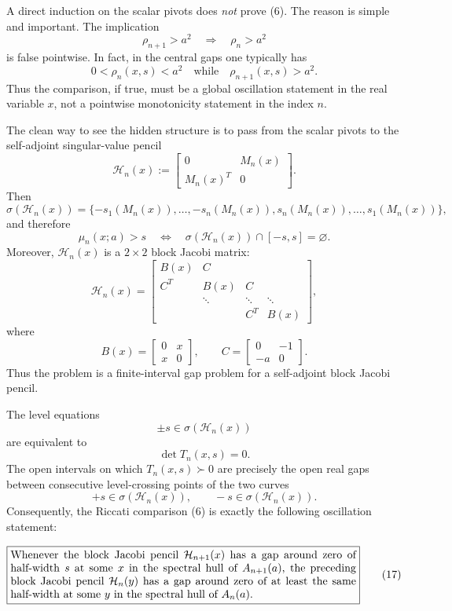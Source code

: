 \documentclass[11pt]{article}
\begin{document}
A direct induction on the scalar pivots does \emph{not} prove (6).  The reason is simple and important.  The implication
\[
\rho_{n+1}>a^2
\quad\Longrightarrow\quad
\rho_n>a^2
\tag{7}
\]
is false pointwise.  In fact, in the central gaps one typically has
\[
0<\rho_n(x,s)<a^2
\quad\text{while}\quad
\rho_{n+1}(x,s)>a^2.
\tag{8}
\]
Thus the comparison, if true, must be a global oscillation statement in the real variable \(x\), not a pointwise monotonicity statement in the index \(n\).

The clean way to see the hidden structure is to pass from the scalar pivots to the
self-adjoint singular-value pencil
\[
\mathcal H_n(x):=
\begin{bmatrix}
0&M_n(x)\\
M_n(x)^T&0
\end{bmatrix}.
\tag{9}
\]
Then
\[
\sigma(\mathcal H_n(x))
=
\{-s_1(M_n(x)),\dots,-s_n(M_n(x)),
s_n(M_n(x)),\dots,s_1(M_n(x))\},
\tag{10}
\]
and therefore
\[
\mu_n(x;a)>s
\quad\Longleftrightarrow\quad
\sigma(\mathcal H_n(x))\cap[-s,s]=\varnothing.
\tag{11}
\]
Moreover, \(\mathcal H_n(x)\) is a \(2\times2\) block Jacobi matrix:
\[
\mathcal H_n(x)=
\begin{bmatrix}
B(x)&C\\
C^T&B(x)&C\\
&\ddots&\ddots&\ddots\\
&&C^T&B(x)
\end{bmatrix},
\tag{12}
\]
where
\[
B(x)=
\begin{bmatrix}
0&x\\
x&0
\end{bmatrix},
\qquad
C=
\begin{bmatrix}
0&-1\\
-a&0
\end{bmatrix}.
\tag{13}
\]
Thus the problem is a finite-interval gap problem for a self-adjoint block Jacobi pencil.

The level equations
\[
\pm s\in\sigma(\mathcal H_n(x))
\tag{14}
\]
are equivalent to
\[
\det T_n(x,s)=0.
\tag{15}
\]
The open intervals on which \(T_n(x,s)\succ0\) are precisely the open real gaps between consecutive level-crossing points of the two curves
\[
+s\in\sigma(\mathcal H_n(x)),
\qquad
-s\in\sigma(\mathcal H_n(x)).
\tag{16}
\]
Consequently, the Riccati comparison (6) is exactly the following oscillation statement:

\[
\boxed{
\begin{minipage}{0.91\linewidth}
Whenever the block Jacobi pencil \(\mathcal H_{n+1}(x)\) has a gap around zero of half-width \(s\) at some \(x\) in the spectral hull of \(A_{n+1}(a)\), the preceding block Jacobi pencil \(\mathcal H_n(y)\) has a gap around zero of at least the same half-width at some \(y\) in the spectral hull of \(A_n(a)\).
\end{minipage}}
\tag{17}
\]
\end{document}
